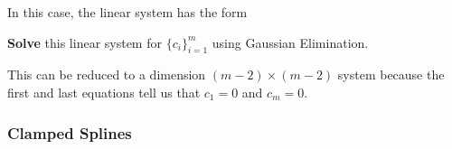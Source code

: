 In this case, the linear system has the form

\textbf{Solve} this linear system for \( \{ c_i \}_{i=1}^{m} \) using Gaussian Elimination.

\begin{note}
    This can be reduced to a dimension \( (m - 2) \times (m - 2) \) system because the first and last equations tell us that \( c_1 = 0 \) and \( c_m = 0 \).
\end{note}

\subsubsection{Clamped Splines}

